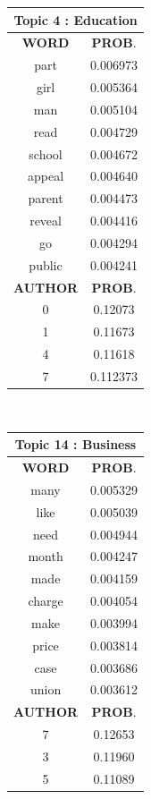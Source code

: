\begin{table}[h!]
\begin{tabular}{|c c|}
 \hline
\end{tabular}
 \hfill
 \begin{tabular}{|c c|} 
\hline
\multicolumn{2}{|c|}{\textbf{Topic 4 : Education}} \\
\hline
 \textbf{WORD} & \textbf{PROB}.  \\ [0.3ex] 
 \hline
 part  & 0.006973 \\
	girl  &  0.005364\\
	man   & 0.005104\\
	read  &  0.004729\\
	school  &  0.004672\\
	appeal   & 0.004640\\
	parent   & 0.004473\\
	reveal  &  0.004416\\
	go   & 0.004294\\
	public  &  0.004241 \\ [1ex] 
 \hline
  \textbf{AUTHOR} & \textbf{PROB}.  \\ [0.3ex] 
 \hline
 0  & 0.12073 \\ 
1   &  0.11673 \\ 
4  &   0.11618 \\ 
7  &   0.112373 \\ 
 \hline
\end{tabular}
\hfill
\\[1cm]
\begin{tabular}{|c c|} 
\hline
\multicolumn{2}{|c|}{\textbf{Topic 14 : Business}} \\
\hline
 \textbf{WORD} & \textbf{PROB}.  \\ [0.3ex] 
 \hline
 many &  0.005329 \\ 
	like  &    0.005039 \\ 
	need   &   0.004944 \\ 
	month  &    0.004247 \\ 
	made  &    0.004159 \\ 
	charge  &    0.004054 \\ 
	make  &    0.003994 \\ 
	price  &    0.003814 \\ 
	case  &    0.003686 \\ 
	union  &    0.003612 \\ [1ex] 
 \hline
  \textbf{AUTHOR} & \textbf{PROB}.  \\ [0.3ex] 
 \hline
 7 &  0.12653 \\
3 &   0.11960 \\
5 &   0.11089 \\

\end{tabular}
\end{table}
